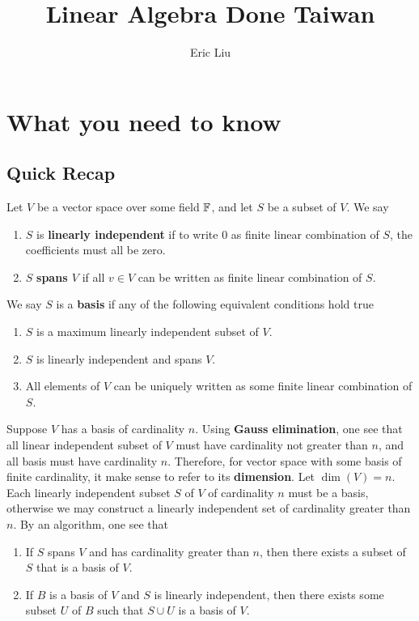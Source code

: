 \documentclass{report}
\title{Linear Algebra Done Taiwan}
\author{Eric Liu}
\date{}
\begin{document}
\maketitle
\newpage%

\tableofcontents
\pagebreak
\chapter{What you need to know}
\section{Quick Recap}
Let $V$ be a vector space over some field $\mathbb{F}$, and let  $S$ be a subset of $V$. We say  
\begin{enumerate}[label=(\alph*)]
  \item $S$ is \textbf{linearly independent} if to write $0$ as finite linear combination of  $S$, the coefficients must all be zero.
  \item  $S$  \textbf{spans $V$} if all $v\in V$ can be written as finite linear combination of $S$. 
\end{enumerate}
We say $S$ is a \textbf{basis} if any of the following equivalent conditions hold true 
\begin{enumerate}[label=(\alph*)]
  \item $S$ is a maximum linearly independent subset of  $V$.  
  \item $S$ is linearly independent and spans $V$.  
  \item All elements of $V$ can be uniquely written as some finite linear combination of  $S$. 
\end{enumerate}
Suppose $V$ has a basis  of cardinality $n$. Using \textbf{Gauss elimination}, one see that all linear independent subset of $V$ must have cardinality not greater than $n$, and all basis must have cardinality $n$. Therefore, for vector space with some basis of finite cardinality, it make sense to refer to its \textbf{dimension}. Let $\operatorname{dim}(V)=n$. Each linearly independent subset $S$ of  $V$ of cardinality  $n$ must be a basis, otherwise we may construct a linearly independent set of cardinality greater than  $n$. By an algorithm, one see that 
\begin{enumerate}[label=(\alph*)]
  \item If $S$ spans  $V$ and has cardinality greater than  $n$, then there exists a subset of $S$ that is a basis of $V$.  
  \item If $B$ is a basis of  $V$ and  $S$ is linearly independent, then there exists some subset  $U$ of $B$ such that  $S \cup  U$ is a basis of $V$.   
\end{enumerate}
\end{document}
